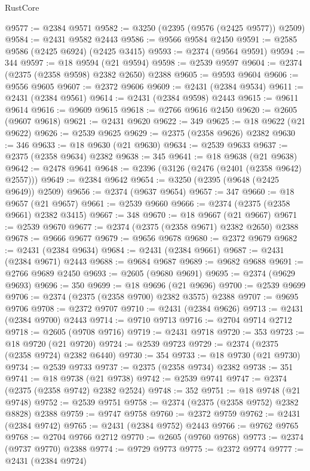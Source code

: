 \begin{lexlean}{RustCore}
\begin{coremodule}
@9577 := @2384 @9571
@9582 := @3250 (@2395 (@9576 (@2425 @9577)) @2509)
@9584 := @2431 @9582 @2443
@9586 := @9566 @9584 @2450
@9591 := @2585 @9586 (@2425 @6924) (@2425 @3415)
@9593 := @2374 (@9564 @9591)
@9594 := 344
@9597 := @18 @9594 (@21 @9594)
@9598 := @2539 @9597
@9604 := @2374 (@2375 (@2358 @9598) @2382 @2650) @2388
@9605 := @9593 @9604
@9606 := @9556 @9605
@9607 := @2372 @9606
@9609 := @2431 (@2384 @9534)
@9611 := @2431 (@2384 @9561)
@9614 := @2431 (@2384 @9598) @2443
@9615 := @9611 @9614
@9616 := @9609 @9615
@9618 := @2766 @9616 @2450
@9620 := @2605 (@9607 @9618)
@9621 := @2431 @9620
@9622 := 349
@9625 := @18 @9622 (@21 @9622)
@9626 := @2539 @9625
@9629 := @2375 (@2358 @9626) @2382
@9630 := 346
@9633 := @18 @9630 (@21 @9630)
@9634 := @2539 @9633
@9637 := @2375 (@2358 @9634) @2382
@9638 := 345
@9641 := @18 @9638 (@21 @9638)
@9642 := @2478 @9641
@9648 := @2396 (@3126 (@2476 (@2401 (@2358 @9642) @2557)))
@9649 := @2384 @9642
@9654 := @3250 (@2395 (@9648 (@2425 @9649)) @2509)
@9656 := @2374 (@9637 @9654)
@9657 := 347
@9660 := @18 @9657 (@21 @9657)
@9661 := @2539 @9660
@9666 := @2374 (@2375 (@2358 @9661) @2382 @3415)
@9667 := 348
@9670 := @18 @9667 (@21 @9667)
@9671 := @2539 @9670
@9677 := @2374 (@2375 (@2358 @9671) @2382 @2650) @2388
@9678 := @9666 @9677
@9679 := @9656 @9678
@9680 := @2372 @9679
@9682 := @2431 (@2384 @9634)
@9684 := @2431 (@2384 @9661)
@9687 := @2431 (@2384 @9671) @2443
@9688 := @9684 @9687
@9689 := @9682 @9688
@9691 := @2766 @9689 @2450
@9693 := @2605 (@9680 @9691)
@9695 := @2374 (@9629 @9693)
@9696 := 350
@9699 := @18 @9696 (@21 @9696)
@9700 := @2539 @9699
@9706 := @2374 (@2375 (@2358 @9700) @2382 @3575) @2388
@9707 := @9695 @9706
@9708 := @2372 @9707
@9710 := @2431 (@2384 @9626)
@9713 := @2431 (@2384 @9700) @2443
@9714 := @9710 @9713
@9716 := @2704 @9714 @2712
@9718 := @2605 (@9708 @9716)
@9719 := @2431 @9718
@9720 := 353
@9723 := @18 @9720 (@21 @9720)
@9724 := @2539 @9723
@9729 := @2374 (@2375 (@2358 @9724) @2382 @6440)
@9730 := 354
@9733 := @18 @9730 (@21 @9730)
@9734 := @2539 @9733
@9737 := @2375 (@2358 @9734) @2382
@9738 := 351
@9741 := @18 @9738 (@21 @9738)
@9742 := @2539 @9741
@9747 := @2374 (@2375 (@2358 @9742) @2382 @2524)
@9748 := 352
@9751 := @18 @9748 (@21 @9748)
@9752 := @2539 @9751
@9758 := @2374 (@2375 (@2358 @9752) @2382 @8828) @2388
@9759 := @9747 @9758
@9760 := @2372 @9759
@9762 := @2431 (@2384 @9742)
@9765 := @2431 (@2384 @9752) @2443
@9766 := @9762 @9765
@9768 := @2704 @9766 @2712
@9770 := @2605 (@9760 @9768)
@9773 := @2374 (@9737 @9770) @2388
@9774 := @9729 @9773
@9775 := @2372 @9774
@9777 := @2431 (@2384 @9724)

\end{coremodule}
\end{lexlean}
